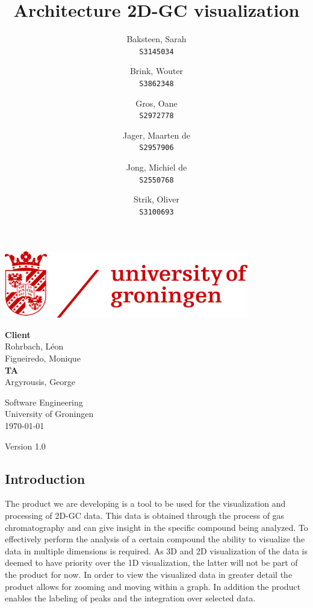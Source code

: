 \documentclass{article}
\title{Architecture 2D-GC visualization}
\author{
  Baksteen, Sarah\\
  \texttt{S3145034}
  \and
  Brink, Wouter\\
  \texttt{S3862348}
  \and
  Gros, Oane\\
  \texttt{S2972778}
  \and
  Jager, Maarten de \\
  \texttt{S2957906}
  \and
  Jong, Michiel de \\
  \texttt{S2550768}
  \and
  Strik, Oliver\\
  \texttt{S3100693}
}
\date{}
\begin{document}
\clearpage
\maketitle
\thispagestyle{empty}
\begin{center}
    \vfill
    \includegraphics[width=0.8\textwidth]{UG_logo.jpg}
    \vfill
    
    \Large
    \textbf{Client} \\
    Rohrbach, Léon \\
    Figueiredo, Monique \\
    
    \vspace{1cm}
    \textbf{TA} \\
    Argyrousis, George
    
    \vspace{2cm}
        Software Engineering \\
        University of Groningen \\
        \today \\
        \empty
        
        \vspace{1cm}
        Version 1.0
\end{center}

\newpage\setcounter{page}{1}
\subsection*{Introduction}

The product we are developing is a tool to be used for the visualization and processing of 2D-GC data. This data is obtained through the process of gas chromatography and can give insight in the specific compound being analyzed. To effectively perform the analysis of a certain compound the ability to visualize the data in multiple dimensions is required. As 3D and 2D visualization of the data is deemed to have priority over the 1D visualization, the latter will not be part of the product for now. In order to view the visualized data in greater detail the product allows for zooming and moving within a graph. In addition the product enables the labeling of peaks and the integration over selected data.
\end{document}
